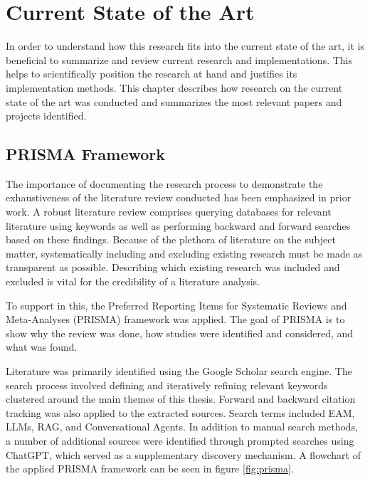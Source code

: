 \chapter{Current State of the Art}
\label{ch:SOTA}
In order to understand how this research fits into the current state of the art, it is beneficial to summarize and review current research and implementations. This helps to scientifically position the research at hand and justifies its implementation methods. This chapter describes how research on the current state of the art was conducted and summarizes the most relevant papers and projects identified.
%
%
\section{PRISMA Framework}
\label{sec:prisma}
The importance of documenting the research process to demonstrate the exhaustiveness of the literature review conducted has been emphasized in prior work. A robust literature review comprises querying databases for relevant literature using keywords as well as performing backward and forward searches based on these findings. Because of the plethora of literature on the subject matter, systematically including and excluding existing research must be made as transparent as possible. Describing which existing research was included and excluded is vital for the credibility of a literature analysis. \cite{brocke2009reconstructing, webster2002analyzing}

To support in this, the Preferred Reporting Items for Systematic Reviews and Meta-Analyses (PRISMA) framework was applied. The goal of PRISMA is to show why the review was done, how studies were identified and considered, and what was found. \cite{page2021prisma}

Literature was primarily identified using the Google Scholar search engine. The search process involved defining and iteratively refining relevant keywords clustered around the main themes of this thesis. Forward and backward citation tracking was also applied to the extracted sources. Search terms included EAM, LLMs, RAG, and Conversational Agents. In addition to manual search methods, a number of additional sources were identified through prompted searches using ChatGPT, which served as a supplementary discovery mechanism. \cite{openai_chatgpt_2023} A flowchart of the applied PRISMA framework can be seen in figure \ref{fig:prisma}.

